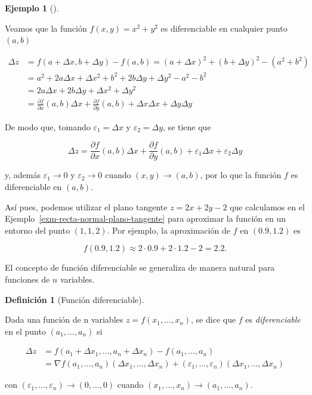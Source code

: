\documentclass[
  a4paper,
]{scrreport}
\theoremstyle{definition}
\newtheorem{definition}{Definición}[chapter]
\theoremstyle{plain}
\theoremstyle{plain}
\theoremstyle{definition}
\theoremstyle{definition}
\newtheorem{example}{Ejemplo}[chapter]
\theoremstyle{plain}
\theoremstyle{remark}
\begin{document}
\begin{example}[]\protect\hypertarget{exm-aproximacion-funcion-dos-variables-plano-tangente}{}\label{exm-aproximacion-funcion-dos-variables-plano-tangente}

Veamos que la función \(f(x,y)=x^2 + y^2\) es diferenciable en cualquier
punto \((a,b)\)

\begin{align*}
\Delta z 
&= f(a+\Delta x, b+\Delta y) - f(a,b) 
= (a+\Delta x)^2 + (b+\Delta y)^2 - (a^2 + b^2) \\
&= a^2 + 2a\Delta x + \Delta x^2 + b^2 + 2b\Delta y + \Delta y^2 - a^2 - b^2\\
&= 2a\Delta x + 2b\Delta y + \Delta x^2 + \Delta y^2 \\
&= \frac{\partial f}{\partial x}(a,b) \Delta x + \frac{\partial f}{\partial y}(a,b) + \Delta x \Delta x + \Delta y \Delta y
\end{align*}

De modo que, tomando \(\varepsilon_1 = \Delta x\) y
\(\varepsilon_2 = \Delta y\), se tiene que

\[
\Delta z = \frac{\partial f}{\partial x}(a,b) \Delta x + \frac{\partial f}{\partial y}(a,b) + \varepsilon_1 \Delta x + \varepsilon_2 \Delta y
\]

y, además \(\varepsilon_1\to 0\) y \(\varepsilon_2\to 0\) cuando
\((x,y)\to (a,b)\), por lo que la función \(f\) es diferenciable en
\((a,b)\).

Así pues, podemos utilizar el plano tangente \(z = 2x+2y-2\) que
calculamos en el Ejemplo~\ref{exm-recta-normal-plano-tangente} para
aproximar la función en un entorno del punto \((1, 1, 2)\). Por ejemplo,
la aproximación de \(f\) en \((0.9, 1.2)\) es

\[
f(0.9, 1.2) \approx 2\cdot 0.9 + 2\cdot 1.2 - 2 = 2.2.
\]

\end{example}

El concepto de función diferenciable se generaliza de manera natural
para funciones de \(n\) variables.

\begin{definition}[Función
diferenciable]\protect\hypertarget{def-funcion-varias-variables-diferenciable}{}\label{def-funcion-varias-variables-diferenciable}

Dada una función de n variables \(z=f(x_1,\ldots,x_n)\), se dice que
\(f\) es \emph{diferenciable} en el punto \((a_1,\ldots,a_n)\) si

\begin{align*}
\Delta z 
&= f(a_1+\Delta x_1, \ldots, a_n+\Delta x_n) - f(a_1,\ldots,a_n) \\
&= \nabla f(a_1,\ldots,a_n) (\Delta x_1,\ldots, \Delta x_n) + (\varepsilon_1,\ldots, \varepsilon_n)(\Delta x_1,\ldots, \Delta x_n)
\end{align*}

con \((\varepsilon_1,\ldots, \varepsilon_n) \to (0,\ldots,0)\) cuando
\((x_1,\ldots,x_n)\to (a_1,\ldots,a_n)\).

\end{definition}
\end{document}

